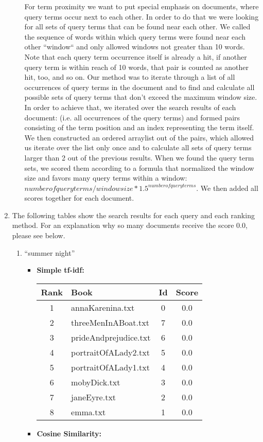 \documentclass[a4paper,11pt,oneside]{book}
\begin{document}
\begin{enumerate}
\begin{itemize}
								For term proximity we want to put special emphasis on documents, where query terms occur next to each other. In order to do that we were looking for all sets of query terms that can be found near each other. We called the sequence of words within which query terms were found near each other ``window`` and only allowed windows not greater than 10 words. Note that each query term occurrence itself is already a hit, if another query term is within reach of 10 words, that pair is counted as another hit, too, and so on. Our method was to iterate through a list of all occurrences of query terms in the document and to find and calculate all possible sets of query terms that don't exceed the maximum window size. In order to achieve that, we iterated over the search results of each document: (i.e. all occurrences of the query terms) and formed pairs consisting of the term position and an index representing the term itself. We then constructed an ordered arraylist out of the pairs, which allowed us iterate over the list only once and to calculate all sets of query terms larger than 2 out of the previous results. When we found the query term sets, we scored them according to a formula that normalized the window size and favors many query terms within a window: $number of query terms/ window size * 1.5^{number of query terms}$. We then added all scores together for each document.
									
					\end{itemize}
		
		
		\item The following tables show the search results for each query and each ranking method. For an explanation why so many documents receive the score 0.0, please see below.

		
		\begin{enumerate}
			\item ``summer night''
						\begin{itemize}
							\item \textbf{Simple tf-idf:}
							
										\begin{tabular}{clcc}
											\toprule
												\textbf{Rank} & \textbf{Book} & \textbf{Id} & \textbf{Score}\\
											\hline
												1	&	annaKarenina.txt	&	0	&	0.0	\\
												2	&	threeMenInABoat.txt	&	7	&	0.0	\\
												3	&	prideAndprejudice.txt	&	6	&	0.0	\\
												4	&	portraitOfALady2.txt	&	5	&	0.0	\\
												5	&	portraitOfALady1.txt	&	4	&	0.0	\\
												6	&	mobyDick.txt	&	3	&	0.0	\\
												7	&	janeEyre.txt	&	2	&	0.0	\\
												8	&	emma.txt	&	1	&	0.0	\\
											\bottomrule
										\end{tabular}\newline
							\item \textbf{Cosine Similarity:}
							

\end{itemize}
\end{enumerate}
\end{enumerate}
\end{document}
